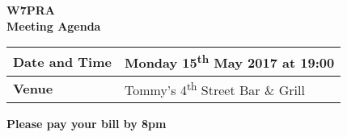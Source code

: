 \documentclass[letter,11pt]{extarticle}
\begin{document}
	\thispagestyle{empty}
	
	\begin{center}
		\textbf{W7PRA\\Meeting Agenda}
		\vspace{0.33cm}
	\end{center}
	
	\begin{center}
		\begin{tabular}{| m{2.5cm} | m{7.5cm} |} \hline
			\textbf{Date and Time} & Monday 15\textsuperscript{th} May 2017 at 19:00 \\ \hline
			\textbf{Venue} & Tommy's 4\textsuperscript{th} Street Bar \& Grill \\ \hline
				\end{tabular}
	\end{center}
	
	\begin{center}
		\textbf{Please pay your bill by 8pm}
	\end{center}
	
\end{document}
